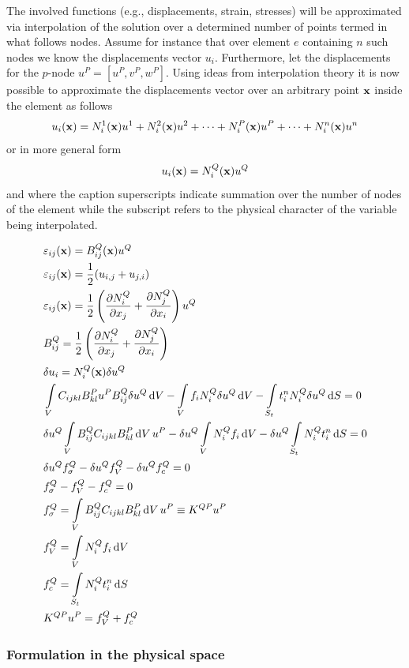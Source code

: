The involved functions (e.g., displacements, strain, stresses) will be approximated via interpolation of the solution over a determined number of points termed in what follows nodes. Assume for instance that over element $e$ containing $n$ such nodes we know the displacements vector $u_i$. Furthermore, let the displacements for the $p$-node $u^P=[u^P, v^P, w^P]$. Using ideas from interpolation theory it is now possible to approximate the displacements vector over an arbitrary point $\vb{x}$ inside the element as follows
\[u_i(\vb x) = N_i^1(\vb x)u^1 + N_i^2(\vb x)u^2 + \cdots + N_i^P(\vb x)u^P + \cdots + N_i^n(\vb x)u^n\]
or in more general form
\begin{equation} \label{bas_interpol}
{u_i}(\vb x) = N_i^Q(\vb x){u^Q}
\end{equation}
and where the caption superscripts indicate summation over the number of nodes of the element while the subscript refers to the physical character of the variable being interpolated.

\begin{align*}
&\varepsilon_{ij}(\vb x) = B_{ij}^Q(\vb x){u^Q}\\
&\varepsilon_{ij}(\vb x) = \frac{1}{2}( u_{i,j} + u_{j,i} )\\
&\varepsilon_{ij}(\vb x) = \frac{1}{2}\left(\pdv{N_i^Q}{x_j} + \pdv{N_j^Q}{x_i} \right){u^Q}\\
&B_{ij}^Q = \frac{1}{2}\left(\pdv{N_i^Q}{x_j} + \pdv{N_j^Q}{x_i} \right)\\
&\delta {u_i} = N_i^Q(\vb x)\delta {u^Q}\\
&\int\limits_V C_{ijkl} B_{kl}^P u^P B_{ij}^Q\delta u^Q \dd{V} - \int\limits_V f_i N_i^Q\delta {u^Q}\dd{V}  - \int\limits_{S_t} t_i^n N_i^Q\delta {u^Q} \dd{S} = 0\\
&\delta {u^Q}\int\limits_V B_{ij}^Q C_{ijkl} B_{kl}^P\dd{V}{u^P} - \delta {u^Q}\int\limits_V N_i^Q{f_i}\dd{V}  - \delta {u^Q}\int\limits_{S_t} N_i^Qt_i^n\dd{S} = 0 \\
&\delta u^Q f_\sigma ^Q - \delta {u^Q}f_V^Q - \delta u^Q f_c^Q = 0\\
&f_\sigma ^Q - f_V^Q - f_c^Q = 0\\
&f_\sigma ^Q = \int\limits_V B_{ij}^Q C_{ijkl} B_{kl}^P\dd{V} u^P \equiv K^{QP} u^P\\
&f_V^Q = \int\limits_V N_i^Q f_i\dd{V} \\
&f_c^Q = \int\limits_{S_t} N_i^Qt_i^n \dd{S} \\
&K^{QP} u^P = f_V^Q + f_c^Q
\end{align*}


\subsubsection{Formulation in the physical space}


